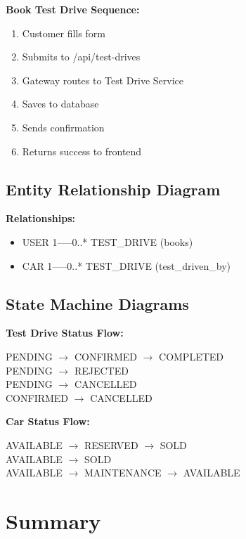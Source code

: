 \documentclass[12pt,a4paper]{article}
\begin{document}
\bigskip
\noindent\textbf{Book Test Drive Sequence:}
\begin{enumerate}
    \item Customer fills form
    \item Submits to /api/test-drives
    \item Gateway routes to Test Drive Service
    \item Saves to database
    \item Sends confirmation
    \item Returns success to frontend
\end{enumerate}

\subsection{Entity Relationship Diagram}

\bigskip
\noindent\textbf{Relationships:}
\begin{itemize}
    \item USER 1-----0..* TEST\_DRIVE (books)
    \item CAR 1-----0..* TEST\_DRIVE (test\_driven\_by)
\end{itemize}

\subsection{State Machine Diagrams}

\bigskip
\noindent\textbf{Test Drive Status Flow:}
\begin{center}
PENDING $\rightarrow$ CONFIRMED $\rightarrow$ COMPLETED \\
PENDING $\rightarrow$ REJECTED \\
PENDING $\rightarrow$ CANCELLED \\
CONFIRMED $\rightarrow$ CANCELLED
\end{center}

\bigskip
\noindent\textbf{Car Status Flow:}
\begin{center}
AVAILABLE $\rightarrow$ RESERVED $\rightarrow$ SOLD \\
AVAILABLE $\rightarrow$ SOLD \\
AVAILABLE $\rightarrow$ MAINTENANCE $\rightarrow$ AVAILABLE
\end{center}

\newpage

\section{Summary}
\label{sec:summary}
\end{document}
